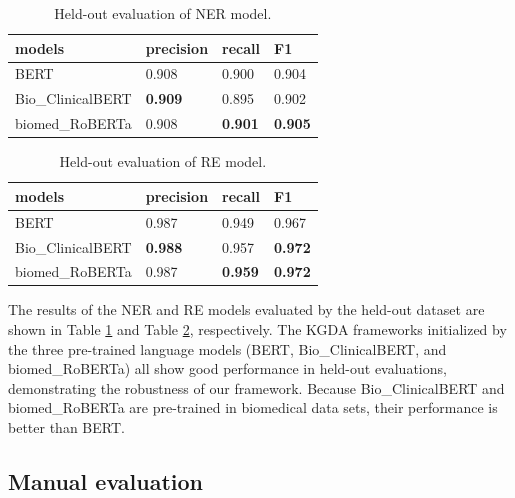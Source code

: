 \documentclass[sigconf]{acmart}
\begin{document}
\begin{table}[h]
	\centering
	\begin{tabular}{llll}
        \hline
        models            & precision      & recall         & F1             \\ \hline
        BERT              & 0.908          & 0.900          & 0.904          \\
        Bio\_ClinicalBERT & \textbf{0.909} & 0.895          & 0.902          \\
        biomed\_RoBERTa   & 0.908          & \textbf{0.901} & \textbf{0.905} \\ \hline
        \end{tabular}
	\caption{Held-out evaluation of NER model.}
	\label{table1}
\end{table}

\begin{table}[h]
	\centering
	\begin{tabular}{llll}
        \hline
        \textbf{models}   & precision      & recall         & F1             \\ \hline
        BERT              & 0.987          & 0.949          & 0.967          \\
        Bio\_ClinicalBERT & \textbf{0.988} & 0.957          & \textbf{0.972} \\
        biomed\_RoBERTa   & 0.987          & \textbf{0.959} & \textbf{0.972} \\ \hline
        \end{tabular}
	\caption{Held-out evaluation of RE model.}
	\label{table2}
\end{table}



The results of the NER and RE models evaluated by the held-out dataset are shown in Table \ref{table1} and Table \ref{table2}, respectively. The KGDA frameworks initialized by the three pre-trained language models (BERT, Bio\_ClinicalBERT, and biomed\_RoBERTa) all show good performance in held-out evaluations, demonstrating the robustness of our framework. Because Bio\_ClinicalBERT and biomed\_RoBERTa are pre-trained in biomedical data sets, their performance is better than BERT.

\subsection{Manual evaluation}
\end{document}
